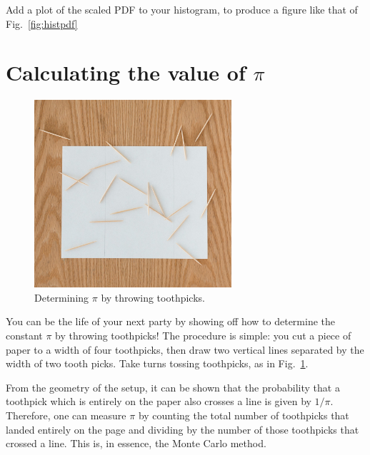 {\plot Add a plot of the scaled PDF to your histogram, to produce a figure like that of Fig.~\ref{fig:histpdf}\\


\section{Calculating the value of $\pi$}

\begin{figure}[htbp]
\begin{center}
\includegraphics[width=0.65\textwidth]{figs/monte_carlo/pitoss.jpg} 
\caption{Determining $\pi$ by throwing toothpicks.}
\label{fig:pitoss}
\end{center}
\end{figure}

\noindent
You can be the life of your next party by showing off how to determine
the constant $\pi$ by throwing toothpicks!  The procedure is simple:
you cut a piece of paper to a width of four toothpicks, then draw two
vertical lines separated by the width of two tooth picks.  Take turns
tossing toothpicks, as in Fig.~\ref{fig:pitoss}.

From the geometry of the setup, it can be shown that the probability
that a toothpick which is entirely on the paper also crosses a line is
given by $1/\pi$.  Therefore, one can measure $\pi$ by counting the
total number of toothpicks that landed entirely on the page and
dividing by the number of those toothpicks that crossed a line.  This
is, in essence, the Monte Carlo method.

}

